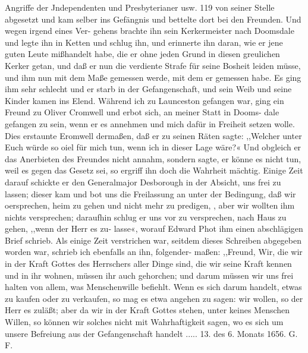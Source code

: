 Angriffe der Jndependenten und Presbyterianer usw. 119
von seiner Stelle abgesetzt und kam selber ins Gefängnis und
bettelte dort bei den Freunden. Und wegen irgend eines Ver-
gehens brachte ihn sein Kerkermeister nach Doomsdale und legte
ihn in Ketten und schlug ihn, und erinnerte ihn daran, wie er
jene guten Leute mißhandelt habe, die er ohne jeden Grund in
diesen greulichen Kerker getan, und daß er nun die verdiente
Strafe für seine Bosheit leiden müsse, und ihm nun mit dem
Maße gemessen werde, mit dem er gemessen habe. Es ging ihm
sehr schlecht und er starb in der Gefangenschaft, und sein Weib
und seine Kinder kamen ins Elend.
Während ich zu Launceston gefangen war, ging ein Freund
zu Oliver Cromwell und erbot sich, an meiner Statt in Dooms-
dale gefangen zu sein, wenn er es annehmen und mich dafür
in Freiheit setzen wolle. Dies erstaunte Eromwell dermaßen,
daß er zu seinen Räten sagte: ,,Welcher unter Euch würde so oiel
für mich tun, wenn ich in dieser Lage wäre?« Und obgleich er
das Anerbieten des Freundes nicht annahm, sondern sagte, er
könne es nicht tun, weil es gegen das Gesetz sei, so ergriff ihn
doch die Wahrheit mächtig. Einige Zeit darauf schickte er den
Generalmajor Desborough in der Absicht, uns frei zu lassen;
dieser kam und bot uns die Freilassung an unter der Bedingung,
daß wir oersprechen, heim zu gehen und nicht mehr zu predigen,
, aber wir wollten ihm nichts versprechen; daraufhin schlug er uns
vor zu versprechen, nach Haus zu gehen, ,,wenn der Herr es zu-
lasse«, worauf Edward Phot ihm einen abschlägigen Brief schrieb.
Als einige Zeit verstrichen war, seitdem dieses Schreiben
abgegeben worden war, schrieb ich ebenfalls an ihn, folgender-
maßen:
,,Freund,
Wir, die wir in der Kraft Gottes des Herrschers aller Dinge
sind, die wir seine Kraft kennen und in ihr wohnen, müssen ihr
auch gehorchen; und darum müssen wir uns frei halten von
allem, was Menschenwille befiehlt. Wenn es sich darum handelt,
etwas zu kaufen oder zu verkaufen, so mag es etwa angehen zu
sagen: wir wollen, so der Herr es zuläßt; aber da wir in der
Kraft Gottes stehen, unter keines Menschen Willen, so können wir
solches nicht mit Wahrhaftigkeit sagen, wo es sich um unsere
Befreiung aus der Gefangenschaft handelt .....
13. des 6. Monats 1656. G. F.

